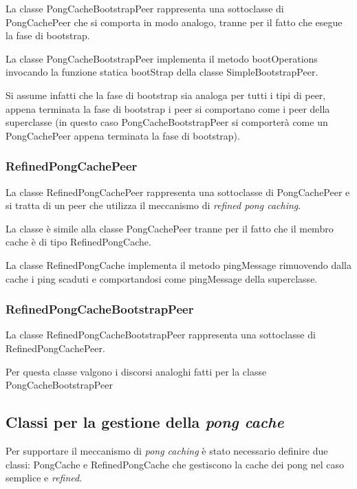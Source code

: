 \documentclass[a4paper,11pt]{article}
\begin{document}
La classe \textsf{PongCacheBootstrapPeer} rappresenta una sottoclasse di \textsf{PongCachePeer} che si comporta in modo analogo, tranne per il fatto che esegue la fase di bootstrap.

La classe \textsf{PongCacheBootstrapPeer} implementa il metodo \textsf{bootOperations} invocando la funzione statica \textsf{bootStrap} della classe \textsf{SimpleBootstrapPeer}. 

Si assume infatti che la fase di bootstrap sia analoga per tutti i tipi di peer, appena terminata la fase di bootstrap i peer si comportano come i peer della superclasse (in questo caso \textsf{PongCacheBootstrapPeer} si comporter\`a come un \textsf{PongCachePeer} appena terminata la fase di bootstrap).

\subsubsection{\textsf{RefinedPongCachePeer}}

La classe \textsf{RefinedPongCachePeer} rappresenta una sottoclasse di \textsf{PongCachePeer} e si tratta di un peer che utilizza il meccanismo di \emph{refined pong caching}.

La classe \`e simile alla classe \textsf{PongCachePeer}  tranne per il fatto che il membro \textsf{cache} \`e di tipo \textsf{RefinedPongCache}.

La classe \textsf{RefinedPongCache} implementa il metodo \textsf{pingMessage} rimuovendo dalla cache i ping scaduti e comportandosi come \textsf{pingMessage} della superclasse.

\subsubsection{\textsf{RefinedPongCacheBootstrapPeer}}

La classe \textsf{RefinedPongCacheBootstrapPeer} rappresenta una sottoclasse di \textsf{RefinedPongCachePeer}.

Per questa classe valgono i discorsi analoghi fatti per la classe \textsf{PongCacheBootstrapPeer}

\subsection{Classi per la gestione della \emph{pong cache}}

Per supportare il meccanismo di \emph{pong caching} \`e stato necessario definire due classi: \textsf{PongCache} e \textsf{RefinedPongCache} che gestiscono la cache dei pong nel caso semplice e \emph{refined}.
\end{document}
